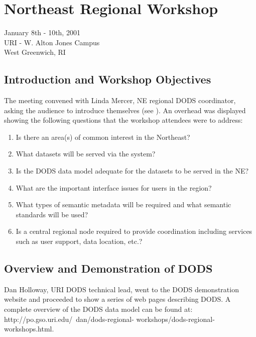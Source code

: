 \renewcommand{\chaptertitle}{Northeast Regional Workshop}
\chapter{\chaptertitle}


\begin{center}
January 8th - 10th, 2001\\
URI - W. Alton Jones Campus\\
West Greenwich, RI\\
\end{center}

\section{Introduction and Workshop Objectives}

The meeting convened with Linda Mercer, NE regional DODS coordinator,
asking the audience to introduce themselves (see ).  An
overhead was displayed showing the following questions that the
workshop attendees were to address:

\begin{enumerate}
\item Is there an area(s) of common interest in the Northeast?
\item What datasets will be served via the system?
\item Is the DODS data model adequate for the datasets to be served in the NE?
\item What are the important interface issues for users in the region?
\item What types of semantic metadata will be required and what
  semantic standards will be used?
\item Is a central regional node required to provide coordination
  including services such as user support, data location, etc.?
\end{enumerate}

\section{Overview and Demonstration of DODS}

Dan Holloway, URI DODS technical lead, went to the DODS demonstration
website and proceeded to show a series of web pages describing DODS.
A complete overview of the DODS data model can be found at:
http://po.gso.uri.edu/~dan/dods-regional-
workshops/dods-regional-workshops.html.

